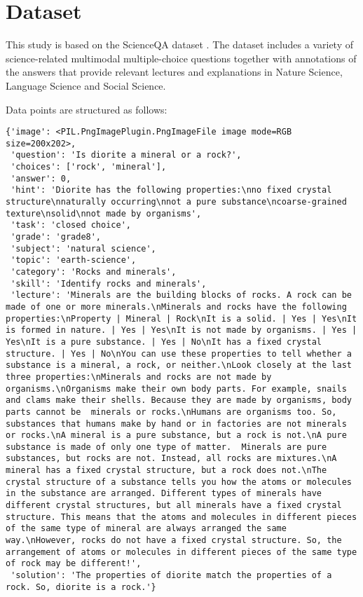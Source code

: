 \documentclass[10pt]{article}
\begin{document}
\section{Dataset}
This study is based on the ScienceQA dataset \cite{lu2022learn}. The dataset includes a variety of science-related multimodal multiple-choice questions together with annotations of the answers that provide relevant lectures and explanations in Nature Science, Language Science and Social Science.

Data points are structured as follows:
\begin{verbatim}
{'image': <PIL.PngImagePlugin.PngImageFile image mode=RGB size=200x202>,
 'question': 'Is diorite a mineral or a rock?',
 'choices': ['rock', 'mineral'],
 'answer': 0,
 'hint': 'Diorite has the following properties:\nno fixed crystal structure\nnaturally occurring\nnot a pure substance\ncoarse-grained texture\nsolid\nnot made by organisms',
 'task': 'closed choice',
 'grade': 'grade8',
 'subject': 'natural science',
 'topic': 'earth-science',
 'category': 'Rocks and minerals',
 'skill': 'Identify rocks and minerals',
 'lecture': 'Minerals are the building blocks of rocks. A rock can be made of one or more minerals.\nMinerals and rocks have the following properties:\nProperty | Mineral | Rock\nIt is a solid. | Yes | Yes\nIt is formed in nature. | Yes | Yes\nIt is not made by organisms. | Yes | Yes\nIt is a pure substance. | Yes | No\nIt has a fixed crystal structure. | Yes | No\nYou can use these properties to tell whether a substance is a mineral, a rock, or neither.\nLook closely at the last three properties:\nMinerals and rocks are not made by organisms.\nOrganisms make their own body parts. For example, snails and clams make their shells. Because they are made by organisms, body parts cannot be  minerals or rocks.\nHumans are organisms too. So, substances that humans make by hand or in factories are not minerals or rocks.\nA mineral is a pure substance, but a rock is not.\nA pure substance is made of only one type of matter.  Minerals are pure substances, but rocks are not. Instead, all rocks are mixtures.\nA mineral has a fixed crystal structure, but a rock does not.\nThe crystal structure of a substance tells you how the atoms or molecules in the substance are arranged. Different types of minerals have different crystal structures, but all minerals have a fixed crystal structure. This means that the atoms and molecules in different pieces of the same type of mineral are always arranged the same way.\nHowever, rocks do not have a fixed crystal structure. So, the arrangement of atoms or molecules in different pieces of the same type of rock may be different!',
 'solution': 'The properties of diorite match the properties of a rock. So, diorite is a rock.'}
\end{verbatim}
\end{document}
